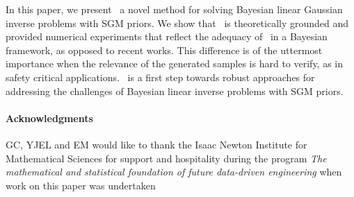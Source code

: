 In this paper, we present \algo\, a novel method for solving Bayesian linear Gaussian inverse problems with SGM priors.%
We show that \algo\ is theoretically grounded and provided numerical experiments that reflect the adequacy of \algo\ in a Bayesian framework, as opposed to recent works.
This difference is of the uttermost importance when the relevance of the generated samples is hard to verify, as in safety critical applications.
\algo\ is a first step towards robust approaches for addressing the challenges of Bayesian linear inverse problems with SGM priors.%

\paragraph{Acknowledgments} GC, YJEL and EM would like to thank the Isaac Newton Institute for Mathematical Sciences for support and hospitality during the program \emph{The mathematical and statistical foundation of future data-driven engineering} when work on this paper was undertaken